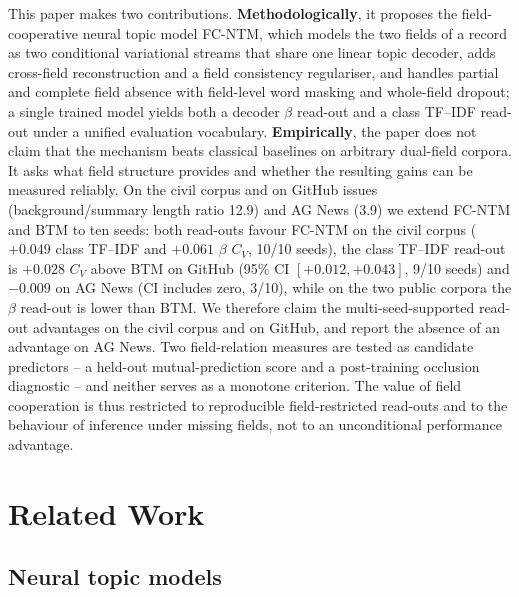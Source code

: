 \documentclass[Journal,letterpaper]{ascelike-new}
\newcommand{\fcntm}{FC-NTM}
\begin{document}
This paper makes two contributions. \textbf{Methodologically}, it proposes the field-cooperative
neural topic model \fcntm{}, which models the two fields of a record as two conditional variational
streams that share one linear topic decoder, adds cross-field reconstruction and a field
consistency regulariser, and handles partial and complete field absence with field-level word
masking and whole-field dropout; a single trained model yields both a decoder $\beta$ read-out and
a class TF--IDF read-out under a unified evaluation vocabulary. \textbf{Empirically}, the paper
does not claim that the mechanism beats classical baselines on arbitrary dual-field corpora.
It asks what field structure provides and whether the resulting gains can be measured reliably.
On the civil corpus and on GitHub issues (background/summary length ratio 12.9) and AG News (3.9)
we extend \fcntm{} and BTM to ten seeds: both read-outs favour \fcntm{} on the civil corpus
($+0.049$ class TF--IDF and $+0.061$ $\beta$ $C_V$, 10/10 seeds), the class TF--IDF read-out is
$+0.028$ $C_V$ above BTM on GitHub (95\% CI $[+0.012,+0.043]$, 9/10 seeds) and $-0.009$ on AG News
(CI includes zero, 3/10), while on the two public corpora the $\beta$ read-out is lower than BTM.
We therefore claim the multi-seed-supported read-out advantages on the civil corpus and on GitHub,
and report the absence of an advantage on AG News. Two field-relation measures
are tested as candidate predictors -- a held-out mutual-prediction score and a post-training
occlusion diagnostic -- and neither serves as a monotone criterion. The value of field cooperation
is thus restricted to reproducible field-restricted read-outs and to the behaviour of inference
under missing fields, not to an unconditional performance advantage.

\section{Related Work}

\subsection{Neural topic models}
\end{document}
